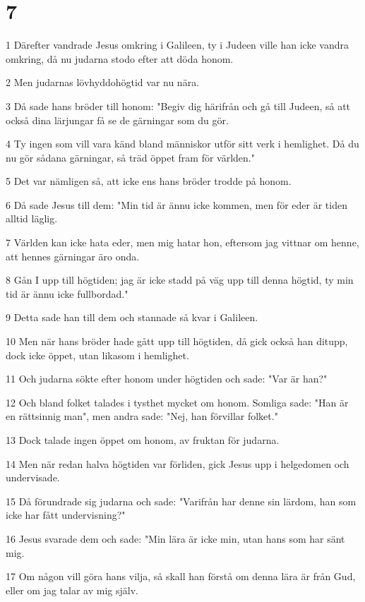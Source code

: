 \chapter{7}

\par 1 Därefter vandrade Jesus omkring i Galileen, ty i Judeen ville han icke vandra omkring, då nu judarna stodo efter att döda honom.
\par 2 Men judarnas lövhyddohögtid var nu nära.
\par 3 Då sade hans bröder till honom: "Begiv dig härifrån och gå till Judeen, så att också dina lärjungar få se de gärningar som du gör.
\par 4 Ty ingen som vill vara känd bland människor utför sitt verk i hemlighet. Då du nu gör sådana gärningar, så träd öppet fram för världen."
\par 5 Det var nämligen så, att icke ens hans bröder trodde på honom.
\par 6 Då sade Jesus till dem: "Min tid är ännu icke kommen, men för eder är tiden alltid läglig.
\par 7 Världen kan icke hata eder, men mig hatar hon, eftersom jag vittnar om henne, att hennes gärningar äro onda.
\par 8 Gån I upp till högtiden; jag är icke stadd på väg upp till denna högtid, ty min tid är ännu icke fullbordad."
\par 9 Detta sade han till dem och stannade så kvar i Galileen.
\par 10 Men när hans bröder hade gått upp till högtiden, då gick också han ditupp, dock icke öppet, utan likasom i hemlighet.
\par 11 Och judarna sökte efter honom under högtiden och sade: "Var är han?"
\par 12 Och bland folket talades i tysthet mycket om honom. Somliga sade: "Han är en rättsinnig man", men andra sade: "Nej, han förvillar folket."
\par 13 Dock talade ingen öppet om honom, av fruktan för judarna.
\par 14 Men när redan halva högtiden var förliden, gick Jesus upp i helgedomen och undervisade.
\par 15 Då förundrade sig judarna och sade: "Varifrån har denne sin lärdom, han som icke har fått undervisning?"
\par 16 Jesus svarade dem och sade: "Min lära är icke min, utan hans som har sänt mig.
\par 17 Om någon vill göra hans vilja, så skall han förstå om denna lära är från Gud, eller om jag talar av mig själv.
